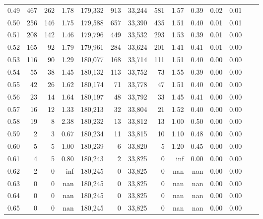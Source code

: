 \begin{tabular}{rrrrrrrrrrrrrr}
0.49 &     467 &    262 &    1.78 &  179,332 &      913 &  33,244 &     581 &  1.57 &  0.39 &  0.02 &      0.01 \\
0.50 &     256 &    146 &    1.75 &  179,588 &      657 &  33,390 &     435 &  1.51 &  0.40 &  0.01 &      0.01 \\
0.51 &     208 &    142 &    1.46 &  179,796 &      449 &  33,532 &     293 &  1.53 &  0.39 &  0.01 &      0.00 \\
0.52 &     165 &     92 &    1.79 &  179,961 &      284 &  33,624 &     201 &  1.41 &  0.41 &  0.01 &      0.00 \\
0.53 &     116 &     90 &    1.29 &  180,077 &      168 &  33,714 &     111 &  1.51 &  0.40 &  0.00 &      0.00 \\
0.54 &      55 &     38 &    1.45 &  180,132 &      113 &  33,752 &      73 &  1.55 &  0.39 &  0.00 &      0.00 \\
0.55 &      42 &     26 &    1.62 &  180,174 &       71 &  33,778 &      47 &  1.51 &  0.40 &  0.00 &      0.00 \\
0.56 &      23 &     14 &    1.64 &  180,197 &       48 &  33,792 &      33 &  1.45 &  0.41 &  0.00 &      0.00 \\
0.57 &      16 &     12 &    1.33 &  180,213 &       32 &  33,804 &      21 &  1.52 &  0.40 &  0.00 &      0.00 \\
0.58 &      19 &      8 &    2.38 &  180,232 &       13 &  33,812 &      13 &  1.00 &  0.50 &  0.00 &      0.00 \\
0.59 &       2 &      3 &    0.67 &  180,234 &       11 &  33,815 &      10 &  1.10 &  0.48 &  0.00 &      0.00 \\
0.60 &       5 &      5 &    1.00 &  180,239 &        6 &  33,820 &       5 &  1.20 &  0.45 &  0.00 &      0.00 \\
0.61 &       4 &      5 &    0.80 &  180,243 &        2 &  33,825 &       0 &   inf &  0.00 &  0.00 &      0.00 \\
0.62 &       2 &      0 &     inf &  180,245 &        0 &  33,825 &       0 &   nan &   nan &  0.00 &      0.00 \\
0.63 &       0 &      0 &     nan &  180,245 &        0 &  33,825 &       0 &   nan &   nan &  0.00 &      0.00 \\
0.64 &       0 &      0 &     nan &  180,245 &        0 &  33,825 &       0 &   nan &   nan &  0.00 &      0.00 \\
0.65 &       0 &      0 &     nan &  180,245 &        0 &  33,825 &       0 &   nan &   nan &  0.00 &      0.00 \\

\end{tabular}
